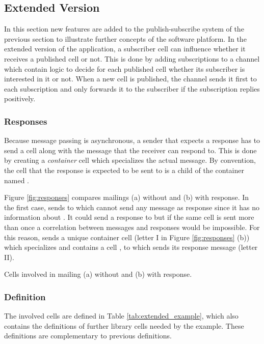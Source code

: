 \subsection{Extended Version}
\label{sec:example_extended}

In this section new features are added to the publish-subscribe system of the previous section to illustrate further concepts of the software platform. In the extended version of the application, a subscriber cell can influence whether it receives a published cell or not. This is done by adding subscriptions to a channel which contain logic to decide for each published cell whether its subscriber is interested in it or not. When a new cell is published, the channel sends it first to each subscription and only forwards it to the subscriber if the subscription replies positively.

\subsubsection{Responses}

Because message passing is asynchronous, a sender that expects a response has to send a cell along with the message that the receiver can respond to. This is done by creating a \textit{container} cell which specializes the actual message. By convention, the cell that the response is expected to be sent to is a child of the container named .

Figure \ref{fig:responses} compares mailings (a) without and (b) with response. In the first case,  sends  to  which cannot send any message as response since it has no information about . It could send a response to  but if the same cell is sent more than once a correlation between messages and responses would be impossible. For this reason,  sends a unique container cell  (letter I in Figure \ref{fig:responses} (b)) which specializes  and contains a cell , to which  sends its response message (letter II).

{Cells involved in mailing (a) without and (b) with response.}

\subsubsection{Definition}

The involved cells are defined in Table \ref{tab:extended_example}, which also contains the definitions of further library cells needed by the example. These definitions are complementary to previous definitions.

